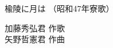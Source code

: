 \documentclass[10pt,b5j]{tarticle} %
\begin{document}
\begin{minipage}[c]{0.7\hsize} %
    \begin{center}
        {\LARGE
            楡陵に月は %
        }
        {\small 
            （昭和47年寮歌） %
        }
    \end{center}
\end{minipage}
\begin{minipage}[c]{0.3\hsize} %
    \begin{flushright} %
        加藤秀弘君 作歌\\矢野哲憲君 作曲 %
    \end{flushright}
\end{minipage}
\end{document}
